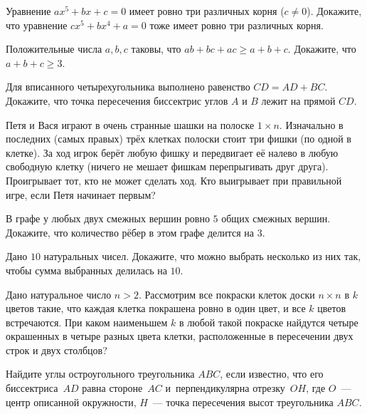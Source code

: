 \resetproblem \begingroup %
    \def\jeolmdate{14 ноября 2018 г.}%
    \def\jeolmauthors{Орлов О.\,П., Тихонов Ю.\,В.}%
\jeolmheader \endgroup


\begin{problems}

\item Уравнение $a x^5 + b x + c = 0$ имеет ровно три различных корня ($c \neq 0$). Докажите, что уравнение $c x^5 + b x^4 + a = 0$ тоже имеет ровно три различных корня.

\item Положительные числа $a, b, c$ таковы, что $ab + bc + ac \geqslant a + b + c$. Докажите, что $a + b + c \geqslant 3$.

\item Для вписанного четырехугольника выполнено равенство $CD = AD + BC$. Докажите, что точка пересечения биссектрис углов $A$ и $B$ лежит на прямой $CD$.

\item Петя и Вася играют в очень странные шашки на полоске $1 \times n$. Изначально в последних (самых правых) трёх клетках полоски стоит три фишки (по одной в клетке). За ход игрок берёт любую фишку и передвигает её налево в любую свободную клетку (ничего не мешает фишкам перепрыгивать друг друга). Проигрывает тот, кто не может сделать ход. Кто выигрывает при правильной игре, если Петя начинает первым?

\item В графе у любых двух смежных вершин ровно $5$ общих смежных вершин. Докажите, что количество рёбер в этом графе делится на $3$.

\item Дано $10$ натуральных чисел. Докажите, что можно выбрать несколько из них так, чтобы сумма выбранных делилась на $10$.

\item Дано натуральное число $n > 2$. Рассмотрим все покраски клеток доски $n \times n$ в $k$ цветов такие, что каждая клетка покрашена ровно в один цвет, и все $k$ цветов встречаются. При каком наименьшем $k$ в любой такой покраске найдутся четыре окрашенных в четыре разных цвета клетки, расположенные в пересечении двух строк и двух столбцов?

\item
Найдите углы остроугольного треугольника $ABC$, если известно, что его
биссектриса~$AD$ равна стороне~$AC$ и~перпендикулярна отрезку~$OH$, где $O$~---
центр описанной окружности, $H$~--- точка пересечения высот треугольника $ABC$.







\end{problems}

